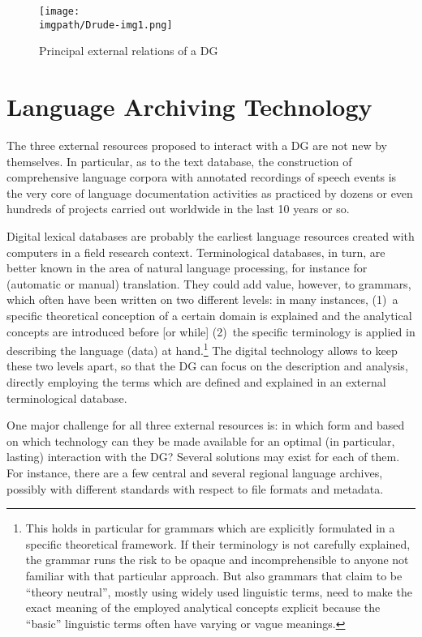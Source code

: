 \begin{figure}
\texttt{[image: \\imgpath/Drude-img1.png]}
\caption{Principal external relations of a DG}
\label{drude:fig:1}
\end{figure}

\section{Language Archiving Technology}  \label{drude:sec:3}
The three external resources proposed to interact with a DG are not new by themselves. In particular, as to the text database, the construction of comprehensive language corpora with annotated recordings of speech events is the very core of language documentation activities as practiced by dozens or even hundreds of projects carried out worldwide in the last 10 years or so.

Digital lexical databases are probably the earliest language resources created with computers in a field research context. Terminological databases, in turn, are better known in the area of natural language processing, for instance for (automatic or manual) translation. They could add value, however, to grammars, which often have been written on two different levels: in many instances, (1)~a specific theoretical conception of a certain domain is explained and the analytical concepts are introduced before [or while] (2)~the specific terminology is applied in describing the language (data) at hand.\footnote{This 
 holds in particular for grammars which are explicitly formulated in a specific theoretical framework. If their terminology is not carefully explained, the grammar runs the risk to be opaque and incomprehensible to anyone not familiar with that particular approach. But also grammars that claim to be ``theory neutral'', mostly using widely used linguistic terms, need to make the exact meaning of the employed analytical concepts explicit because the ``basic'' linguistic terms often have varying or vague meanings.
}
The digital technology allows to keep these two levels apart, so that the DG can focus on the description and analysis, directly employing the terms which are defined and explained in an external terminological database.

One major challenge for all three external resources is: in which form and based on which technology can they be made available for an optimal (in particular, lasting) interaction with the DG? Several solutions may exist for each of them. For instance, there are a few central and several regional language archives, possibly with different standards with respect to file formats and metadata.

